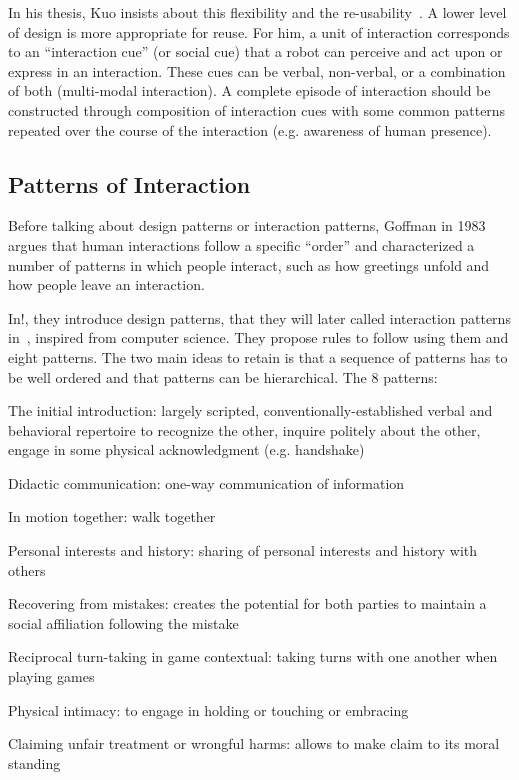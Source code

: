 \documentclass[a4paper,11pt,twoside]{StyleThese}
\begin{document}
In his thesis, Kuo insists about this flexibility and the re-usability~\cite{kuo_2012_designing}. A lower level of design is more appropriate for reuse. For him, a unit of interaction corresponds to an ``interaction cue'' (or social cue) that a robot can perceive and act upon or express in an interaction. These cues can be verbal, non-verbal, or a combination of both (multi-modal interaction). A complete episode of interaction should be constructed through composition of interaction cues with some common patterns repeated over the course of the interaction (e.g. awareness of human presence).

\subsection{Patterns of Interaction}
Before talking about design patterns or interaction patterns, Goffman in 1983~\cite{goffman_1983_interaction} argues that human interactions follow a specific ``order'' and characterized a number of patterns in which people interact, such as how greetings unfold and how people leave an interaction.

In!\cite{kahn_2008_design}, they introduce design patterns, that they will later called interaction patterns in~\cite{kahn_2010_validating}, inspired from computer science. They propose rules to follow using them and eight patterns. The two main ideas to retain is that a sequence of patterns has to be well ordered and that patterns can be hierarchical. 
The 8 patterns: 
\begin{enumerate*}
	\item The initial introduction: largely scripted, conventionally-established verbal and behavioral repertoire to recognize the other, inquire politely about the other, engage in some physical acknowledgment (e.g. handshake)
	\item Didactic communication: one-way communication of information 
	\item In motion together: walk together
	\item Personal interests and history: sharing of personal interests and history with others
	\item Recovering from mistakes: creates the potential for both parties to maintain a social affiliation following the mistake
	\item Reciprocal turn-taking in game contextual: taking turns with one another when playing games
	\item Physical intimacy: to engage in holding or touching or embracing
	\item Claiming unfair treatment or wrongful harms: allows to make claim to its moral standing
\end{enumerate*}
\end{document}
